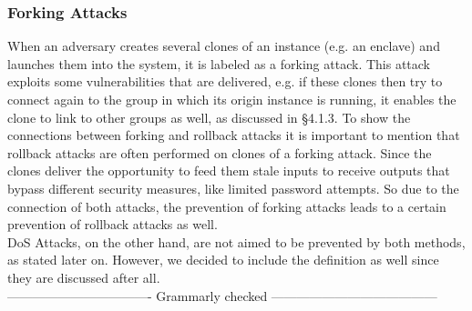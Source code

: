 \subsubsection{Forking Attacks}
When an adversary creates several clones of an instance (e.g. an enclave) and launches them into the system, it is labeled as a forking attack. This attack exploits some vulnerabilities that are delivered, e.g. if these clones then try to connect again to the group in which its origin instance is running, it enables the clone to link to other groups as well, as discussed in §4.1.3. 
To show the connections between forking and rollback attacks it is important to mention that rollback attacks are often performed on clones of a forking attack. Since the clones deliver the opportunity to feed them stale inputs to receive outputs that bypass different security measures, like limited password attempts. So due to the connection of both attacks, the prevention of forking attacks leads to a certain prevention of rollback attacks as well. \\
DoS Attacks, on the other hand, are not aimed to be prevented by both methods, as stated later on. However, we decided to include the definition as well since they are discussed after all. \\


---------------------------------- Grammarly checked ---------------------------------------



